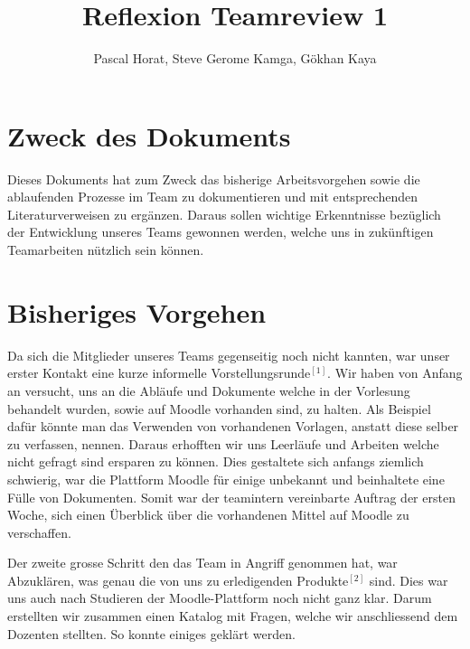 \documentclass[12pt]{article}
\title{Reflexion Teamreview 1}
\author{Pascal Horat, Steve Gerome Kamga, Gökhan Kaya}
\begin{document}
\maketitle

\tableofcontents

\section{Zweck des Dokuments}

Dieses Dokuments hat zum Zweck das bisherige Arbeitsvorgehen sowie die ablaufenden Prozesse im Team zu dokumentieren und mit entsprechenden Literaturverweisen zu ergänzen. Daraus sollen wichtige Erkenntnisse bezüglich der Entwicklung unseres Teams gewonnen werden, welche uns in zukünftigen Teamarbeiten nützlich sein können.

\section{Bisheriges Vorgehen}

Da sich die Mitglieder unseres Teams gegenseitig noch nicht kannten, war unser erster Kontakt eine kurze informelle Vorstellungsrunde$^{[1]}$. Wir haben von Anfang an versucht, uns an die Abläufe und Dokumente welche in der Vorlesung behandelt wurden, sowie auf Moodle vorhanden sind, zu halten. Als Beispiel dafür könnte man das Verwenden von vorhandenen Vorlagen, anstatt diese selber zu verfassen, nennen. Daraus erhofften wir uns Leerläufe und Arbeiten welche nicht gefragt sind ersparen zu können. Dies gestaltete sich anfangs ziemlich schwierig, war die Plattform Moodle für einige unbekannt und beinhaltete eine Fülle von Dokumenten. Somit war der teamintern vereinbarte Auftrag der ersten Woche, sich einen Überblick über die vorhandenen Mittel auf Moodle zu verschaffen.

Der zweite grosse Schritt den das Team in Angriff genommen hat, war Abzuklären, was genau die von uns zu erledigenden Produkte$^{[2]}$ sind. Dies war uns auch nach Studieren der Moodle-Plattform noch nicht ganz klar. Darum erstellten wir zusammen einen Katalog mit Fragen, welche wir anschliessend dem Dozenten stellten. So konnte einiges geklärt werden.
\end{document}
